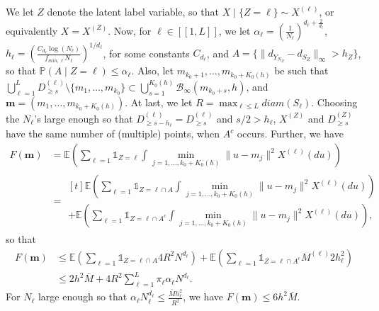 \documentclass[noinfoline,preprint]{article}
\newcommand{\E}{\mathbb{E}}
\renewcommand{\1}{\mathds 1}
\newcommand{\B}{\mathcal{B}}
\begin{document}
We let $Z$ denote the latent label variable, so that $X\mid \{Z=\ell\} \sim X^{(\ell)}$, or equivalently $X = X^{(Z)}$. Now, for $\ell \in [\![1,L]\!]$, we let $\alpha_\ell = \left ( \frac{1}{N_\ell} \right )^{d_\ell + \frac{2}{d_\ell}}$, $h_\ell = \left ( \frac{C_{d_\ell} \log(N_\ell)}{f_{min,\ell} N_\ell} \right)^{1/d_\ell}$, for some constants $C_{d_\ell}$, and $A= \{ \|d_{Y_{N_{Z}}} - d_{S_Z}\|_\infty > h_Z \}$, so that $\mathbb{P}(A \mid Z= \ell ) \leq \alpha_\ell$. Also, let $m_{k_0+1}, \hdots, m_{k_0 + K_0(h)}$ be such that $\bigcup_{ \ell =1}^{L} D_{\geq s}^{(\ell)} \setminus \{m_1, \hdots, m_{k_0} \}  \subset \bigcup_{s=1}^{K_0(h)} \B_{\infty}(m_{k_0+s},h)$, and $\mathbf{m} = (m_1, \hdots, m_{k_0 + K_0(h)})$. At last, we let $R = \max_{\ell \leq L} diam(S_\ell)$. 
Choosing the $N_\ell$'s large enough so that $D^{(\ell)}_{\geq s-h_\ell} = D^{(\ell)}_{\geq s}$ and $s/2 > h_\ell$, $X^{(Z)}$ and $D^{(Z)}_{\geq s}$ have the same number of (multiple) points, when $A^c$ occurs. Further, we have
\begin{align*}
F(\mathbf{m}) &= \E \left ( \sum_{\ell = 1} \mathds{1}_{Z=\ell}  \int \min_{j = 1, \hdots, k_0 + K_0(h)} \| u - m_j \|^2 X^{(\ell)}(du) \right ) \\
         & = \begin{multlined}[t] \E \left ( \sum_{\ell = 1} \mathds{1}_{Z=\ell \cap A}  \int \min_{j = 1, \hdots, k_0 + K_0(h)} \| u - m_j \|^2 X^{(\ell)}(du) \right ) \\
          +  \E \left ( \sum_{\ell = 1} \mathds{1}_{Z=\ell \cap A^c}  \int \min_{j = 1, \hdots, k_0 + K_0(h)} \| u - m_j \|^2 X^{(\ell)}(du) \right ),
          \end{multlined} 
\end{align*}
so that
\begin{align*}          
       F(\mathbf{m})  & \leq \E \left ( \sum_{\ell = 1} \mathds{1}_{Z=\ell \cap A} 4R^2 N^{d_\ell} \right ) + \E \left ( \sum_{\ell = 1} \mathds{1}_{Z=\ell \cap A^c} M^{(\ell)} 2 h_\ell^2 \right ) \\        
          & \leq 2h^2 \bar{M} + 4 R^2 \sum_{\ell =1}^L \pi_\ell \alpha_\ell N^{d_\ell}.
\end{align*}
For $N_\ell$ large enough so that $\alpha_\ell N_\ell^{d_\ell} \leq \frac{\bar{M} h_\ell^2}{R^2}$, we have $
F(\mathbf{m}) \leq 6 h^2 \bar{M}$.
\end{document}
